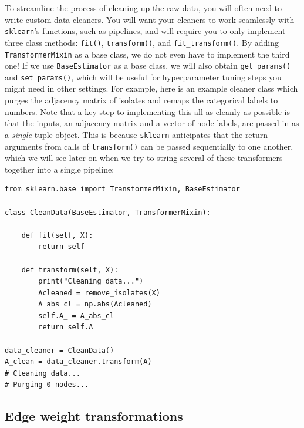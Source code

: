 To streamline the process of cleaning up the raw data, you will often need to write custom data cleaners. You will want your cleaners to work seamlessly with \texttt{sklearn}'s functions, such as pipelines, and will require you to only implement three class methods: \texttt{fit()}, \texttt{transform()}, and \texttt{fit\_transform()}. By adding \texttt{TransformerMixin} as a base class, we do not even have to implement the third one! If we use \texttt{BaseEstimator} as a base class, we will also obtain \texttt{get\_params()} and \texttt{set\_params()}, which will be useful for hyperparameter tuning steps you might need in other settings. For example, here is an example cleaner class which purges the adjacency matrix of isolates and remaps the categorical labels to numbers. Note that a key step to implementing this all as cleanly as possible is that the inputs, an adjacency matrix and a vector of node labels, are passed in as a \emph{single} tuple object. This is because \texttt{sklearn} anticipates that the return arguments from calls of \texttt{transform()} can be passed sequentially to one another, which we will see later on when we try to string several of these transformers together into a single pipeline:

\begin{lstlisting}[style=python]
from sklearn.base import TransformerMixin, BaseEstimator

class CleanData(BaseEstimator, TransformerMixin):

    def fit(self, X):
        return self

    def transform(self, X):
        print("Cleaning data...")
        Acleaned = remove_isolates(X)
        A_abs_cl = np.abs(Acleaned)
        self.A_ = A_abs_cl
        return self.A_

data_cleaner = CleanData()
A_clean = data_cleaner.transform(A)
# Cleaning data...
# Purging 0 nodes...
\end{lstlisting}

\subsection{Edge weight transformations}

